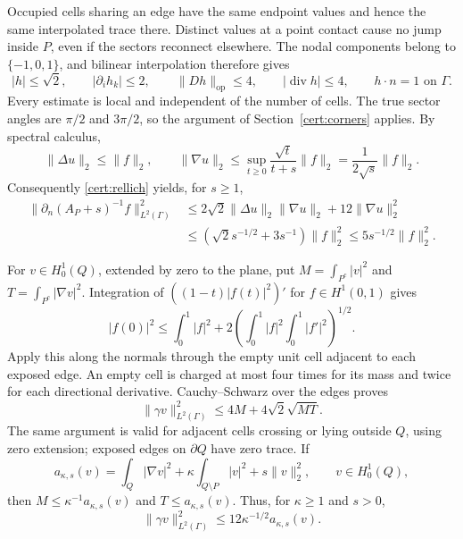 \documentclass[11pt,reqno]{amsart}
\numberwithin{equation}{section}
\newcommand{\norm}[1]{\lVert#1\rVert}
\begin{document}
Occupied cells sharing an edge have the same endpoint values
and hence the same interpolated trace there.  Distinct values at
a point contact cause no jump inside $P$, even if the sectors
reconnect elsewhere.  The nodal components belong to
$\{-1,0,1\}$, and bilinear interpolation therefore gives
\begin{equation}\label{cert:square-field}
 |h|\le\sqrt2,\qquad
 |\partial_i h_k|\le2,\qquad
 \norm{Dh}_{\mathrm{op}}\le4,\qquad
 |\operatorname{div}h|\le4,\qquad h\cdot n=1\text{ on }\Gamma.
\end{equation}
Every estimate is local and independent of the number of cells.
The true sector angles are $\pi/2$ and $3\pi/2$, so
the argument of Section~\ref{cert:corners} applies.  By spectral calculus,
\[
 \norm{\Delta u}_2\le\norm f_2,\qquad
 \norm{\nabla u}_2
 \le\sup_{t\ge0}\frac{\sqrt t}{t+s}\norm f_2
 =\frac1{2\sqrt s}\norm f_2.
\]
Consequently \eqref{cert:rellich} yields, for $s\ge1$,
\begin{equation}\label{cert:square-flux}
\begin{split}
 \norm{\partial_n(A_P+s)^{-1}f}_{L^2(\Gamma)}^2
 &\le2\sqrt2\norm{\Delta u}_2\norm{\nabla u}_2
                         +12\norm{\nabla u}_2^2\\
 &\le(\sqrt2s^{-1/2}+3s^{-1})\norm f_2^2
 \le5s^{-1/2}\norm f_2^2.
\end{split}
\end{equation}

For $v\in H^1_0(Q)$, extended by zero to the plane, put
$M=\int_{P^c}|v|^2$ and $T=\int_{P^c}|\nabla v|^2$.
Integration of $((1-t)|f(t)|^2)'$ for $f\in H^1(0,1)$ gives
\[
 |f(0)|^2\le\int_0^1|f|^2+
          2\left(\int_0^1|f|^2\int_0^1|f'|^2\right)^{1/2}.
\]
Apply this along the normals through the empty unit cell adjacent
to each exposed edge.  An empty cell is charged at most four
times for its mass and twice for each directional derivative.
Cauchy--Schwarz over the edges proves
\begin{equation}\label{cert:square-trace}
 \norm{\gamma v}_{L^2(\Gamma)}^2
 \le4M+4\sqrt2\sqrt{MT}.
\end{equation}
The same argument is valid for adjacent cells crossing or lying
outside $Q$, using zero extension; exposed edges on $\partial Q$
have zero trace.  If
\begin{equation}\label{cert:penalty-form}
 a_{\kappa,s}(v)=\int_Q|\nabla v|^2+
       \kappa\int_{Q\setminus P}|v|^2+s\norm v_2^2,
 \qquad v\in H^1_0(Q),
\end{equation}
then $M\le\kappa^{-1}a_{\kappa,s}(v)$ and
$T\le a_{\kappa,s}(v)$.  Thus, for $\kappa\ge1$ and $s>0$,
\begin{equation}\label{cert:square-penalty-trace}
 \norm{\gamma v}_{L^2(\Gamma)}^2
 \le12\kappa^{-1/2}a_{\kappa,s}(v).
\end{equation}
\end{document}
